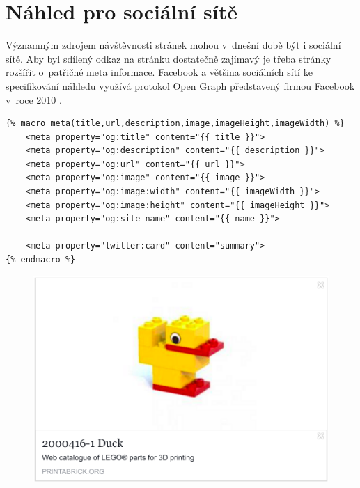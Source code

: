 \section{Náhled pro sociální sítě}
Významným zdrojem návštěvnosti stránek mohou v~dnešní době být i sociální sítě. Aby byl sdílený odkaz na stránku dostatečně zajímavý je třeba stránky rozšířit o~patřičné meta informace. Facebook a většina sociálních sítí ke specifikování náhledu využívá protokol Open Graph představený firmou Facebook v~roce 2010 \autocite{opengraph}.

\begin{listing}[htbp]
  \begin{verbatim}
{% macro meta(title,url,description,image,imageHeight,imageWidth) %}
    <meta property="og:title" content="{{ title }}">
    <meta property="og:description" content="{{ description }}">
    <meta property="og:url" content="{{ url }}">
    <meta property="og:image" content="{{ image }}">
    <meta property="og:image:width" content="{{ imageWidth }}">
    <meta property="og:image:height" content="{{ imageHeight }}">
    <meta property="og:site_name" content="{{ name }}">

    <meta property="twitter:card" content="summary">
{% endmacro %}
  \end{verbatim}
  \caption{\label{opengraph-meta}}
\end{listing}

\begin{figure}[htbp]
        \centering
        \includegraphics[width=\textwidth,height=\textheight,keepaspectratio]{images/fbshare.png}
        \caption{\label{facebook-share}}
\end{figure}